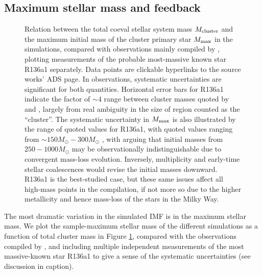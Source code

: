 \documentclass[apjl,twocolumn]{openjournal}
\begin{document}
\subsection{Maximum stellar mass and feedback}
\label{sec:mmax_experiments}
\begin{figure}
	
	\caption{Relation between the total coeval stellar system mass $M_{\rm cluster}$ and the maximum initial mass of the cluster primary star $M_{\rm max}$ in the simulations, compared with observations mainly compiled by \citet{yan:2023.mmax.mecl.relation}, plotting measurements of the probable most-massive known star R136a1 separately. Data points are clickable hyperlinks to the source works' ADS page. In observations, systematic uncertainties are significant for both quantities. Horizontal error bars for R136a1 indicate the factor of $\sim 4$ range between cluster masses quoted by \citet{crowther:2010.r136.300msun} and \citet{weidner:2013.mmax.mecl.relation}, largely from real ambiguity in the size of region counted as the ``cluster''. The systematic uncertainty in $M_{\rm max}$ is also illustrated by the range of quoted values for R136a1, with quoted values ranging from $\sim 150M_\odot-300M_\odot$ \citep{massey:1998.r136.cluster.imf, crowther:2010.r136.300msun,schneider:2018.30dor.imf.excess,keszthelyi:2025.r136.evolutionary.models}, with \citet{higgins:2022.hydrogen.clock.ems} arguing that initial masses from $250-1000M_\odot$ may be observationally indistinguishable due to convergent mass-loss evolution. Inversely, multiplicity \citep{kalari:2022.r136.multiplicity} and early-time stellar coalescences \citep{murray:1996.imf.coalescence} would revise the initial masses downward. R136a1 is the best-studied case, but these same issues affect all high-mass points in the \citet{yan:2023.mmax.mecl.relation} compilation, if not more so due to the higher metallicity and hence mass-loss of the stars in the Milky Way.}
	\label{fig:mmax}
\end{figure}

The most dramatic variation in the simulated IMF is in the maximum stellar mass. We plot the sample-maximum stellar mass of the different simulations as a function of total cluster mass in Figure \ref{fig:mmax}, compared with the observations compiled by \citet{yan:2023.mmax.mecl.relation}, and including multiple independent measurements of the most massive-known star R136a1 to give a sense of the systematic uncertainties (see discussion in caption). 
\end{document}
